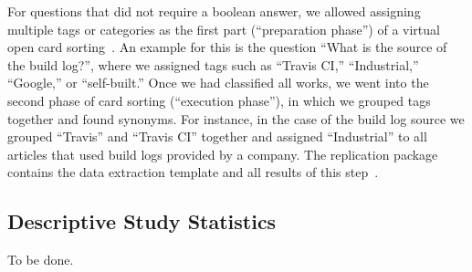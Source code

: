 For questions that did not require a boolean answer, we allowed assigning
multiple tags or categories as the first part (``preparation phase'')
of a virtual open card sorting~\cite{zimmermann2016card}.
An example for this is the question ``What is the source of the build log?'',
where we assigned tags such as ``Travis CI,''
``Industrial,'' ``Google,'' or
``self-built.''
Once we had classified all works, we went into the second phase of card sorting
(``execution phase''), in which we grouped tags
together and found synonyms.
For instance, in the case of the build log source we grouped
``Travis'' and ``Travis CI'' together and assigned ``Industrial'' to
all articles that used build logs provided by a company.
The replication package contains the data extraction template and all results of this step~\cite{brandt2020chunk-replication}.


\subsection{Descriptive Study Statistics}
To be done.


